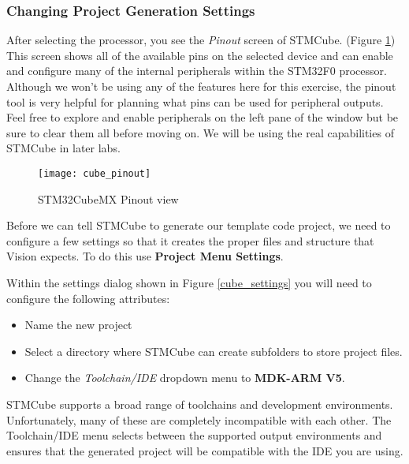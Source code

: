 \documentclass[openany,11pt,fleqn]{book} %
\begin{document}
\subsubsection*{Changing Project Generation Settings}

After selecting the processor, you see the \textit{Pinout} screen of STMCube. (Figure \ref{cube_pinout}) This screen shows all of the available pins on the selected device and can enable and configure many of the internal peripherals within the STM32F0 processor. Although we won't be using any of the features here for this exercise, the pinout tool is very helpful for planning what pins can be used for peripheral outputs. Feel free to explore and enable peripherals on the left pane of the window but be sure to clear them all before moving on. We will be using the real capabilities of STMCube in later labs.

\begin{figure}[h!]
	\centering\texttt{[image: cube\_pinout]}
	\caption{STM32CubeMX Pinout view}
	\label{cube_pinout}
\end{figure}

Before we can tell STMCube to generate our template code project, we need to configure a few settings so that it creates the proper files and structure that {\textmu}Vision expects. To do this use \textbf{Project Menu \textrightarrow Settings}. 

Within the settings dialog shown in Figure \ref{cube_settings} you will need to configure the following attributes:
\begin{itemize}
	\item Name the new project
	\item Select a directory where STMCube can create subfolders to store project files.
	\item Change the \textit{Toolchain/IDE} dropdown menu to \textbf{MDK-ARM V5}.
\end{itemize}

STMCube supports a broad range of toolchains and development environments. Unfortunately, many of these are completely incompatible with each other. The Toolchain/IDE menu selects between the supported output environments and ensures that the generated project will be compatible with the IDE you are using. 
\end{document}
